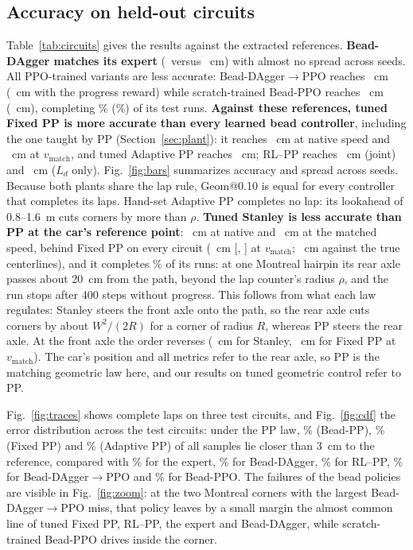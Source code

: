 \documentclass{IJCAS}
\begin{document}
\subsection{Accuracy on held-out circuits}
Table~\ref{tab:circuits} gives the results against the extracted references. \textbf{Bead-DAgger matches its expert} (\VrmseDagger\ versus \VrmseExpert~cm) with almost no spread across seeds. All PPO-trained variants are less accurate: Bead-DAgger$\to$PPO reaches \VrmseDP~cm (\VrmseDPacc~cm with the progress reward) while scratch-trained Bead-PPO reaches \VrmsePPO~cm (\VrmsePPOacc~cm), completing \VcompPPO\% (\VcompPPOacc\%) of its test runs. \textbf{Against these references, tuned Fixed PP is more accurate than every learned bead controller}, including the one taught by PP (Section~\ref{sec:plant}): it reaches \VrmseFix~cm at native speed and \VrmseFixM~cm at $v_{\mathrm{match}}$, and tuned Adaptive PP reaches \VrmseAd~cm; RL--PP reaches \VrmseRL~cm (joint) and \VrmseRLld~cm ($L_d$ only). Fig.~\ref{fig:bars} summarizes accuracy and spread across seeds. Because both plants share the lap rule, Geom@0.10 is equal for every controller that completes its laps. Hand-set Adaptive PP completes no lap: its lookahead of 0.8--1.6~m cuts corners by more than $\rho$. \textbf{Tuned Stanley is less accurate than PP at the car's reference point}: \VrmseSt~cm at native and \VrmseStM~cm at the matched speed, behind Fixed PP on every circuit (\VcmpStFixMDiff~cm [\VcmpStFixMLo, \VcmpStFixMHi] at $v_{\mathrm{match}}$; \VtrueStFixMDiff~cm against the true centerlines), and it completes \VcompSt\% of its runs: at one Montreal hairpin its rear axle passes about 20~cm from the path, beyond the lap counter's radius $\rho$, and the run stops after 400 steps without progress. This follows from what each law regulates: Stanley steers the front axle onto the path, so the rear axle cuts corners by about $W^2/(2R)$ for a corner of radius $R$, whereas PP steers the rear axle. At the front axle the order reverses (\VfrontStM~cm for Stanley, \VfrontFixM~cm for Fixed PP at $v_{\mathrm{match}}$). The car's position and all metrics refer to the rear axle, so PP is the matching geometric law here, and our results on tuned geometric control refer to PP.

Fig.~\ref{fig:traces} shows complete laps on three test circuits, and Fig.~\ref{fig:cdf} the error distribution across the test circuits: under the PP law, \VwithinBpp\% (Bead-PP), \VwithinFix\% (Fixed PP) and \VwithinAd\% (Adaptive PP) of all samples lie closer than 3~cm to the reference, compared with \VwithinExpert\% for the expert, \VwithinDagger\% for Bead-DAgger, \VwithinRL\% for RL--PP, \VwithinDP\% for Bead-DAgger$\to$PPO and \VwithinPPO\% for Bead-PPO. The failures of the bead policies are visible in Fig.~\ref{fig:zoom}: at the two Montreal corners with the largest Bead-DAgger$\to$PPO miss, that policy leaves by a small margin the almost common line of tuned Fixed PP, RL--PP, the expert and Bead-DAgger, while scratch-trained Bead-PPO drives inside the corner.
\end{document}
